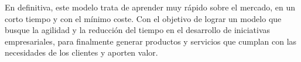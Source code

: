 \documentclass[10pt,a4paper]{article}
\begin{document}
\begin{multicols}{2}
		En definitiva, este modelo trata de aprender muy rápido sobre el mercado, en un corto tiempo y con el mínimo coste.  Con el objetivo de lograr un modelo que busque la agilidad y la reducción del tiempo en el desarrollo de iniciativas empresariales, para finalmente generar productos y servicios que cumplan con las necesidades de los clientes y aporten valor.\\
		
		
			
			
			
		\end{multicols}	
			
\end{document}

